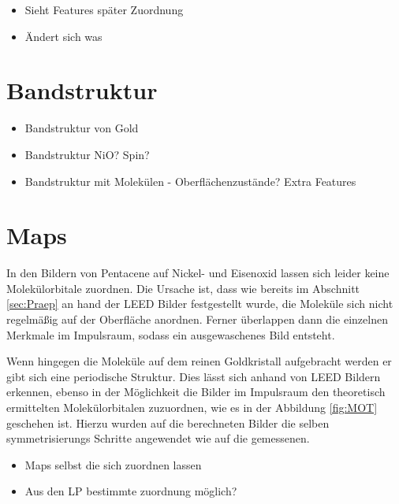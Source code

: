         \begin{itemize}
            \item Sieht Features später Zuordnung
            \item Ändert sich was
        \end{itemize}

    \section{Bandstruktur}
        \begin{itemize}
            \item Bandstruktur von Gold
            \item Bandstruktur NiO? Spin?
            \item Bandstruktur mit Molekülen - Oberflächenzustände? Extra Features
        \end{itemize}

    \section{Maps}
        In den Bildern von Pentacene auf Nickel- und Eisenoxid lassen sich leider keine Molekülorbitale zuordnen.
        Die Ursache ist, dass wie bereits im Abschnitt \ref{sec:Praep} an hand der LEED Bilder festgestellt wurde, die Moleküle sich nicht regelmäßig auf der Oberfläche anordnen.
        Ferner überlappen dann die einzelnen Merkmale im Impulsraum, sodass ein ausgewaschenes Bild entsteht.

        Wenn hingegen die Moleküle auf dem reinen Goldkristall aufgebracht werden er gibt sich eine periodische Struktur.
        Dies lässt sich anhand von LEED Bildern erkennen, ebenso in der Möglichkeit die Bilder im Impulsraum den theoretisch ermittelten Molekülorbitalen zuzuordnen, wie es in der Abbildung \ref{fig:MOT} geschehen ist.
        Hierzu wurden auf die berechneten Bilder die selben symmetrisierungs Schritte angewendet wie auf die gemessenen.

        \begin{itemize}
            \item Maps selbst die sich zuordnen lassen
            \item Aus den LP bestimmte zuordnung möglich?
        \end{itemize}

